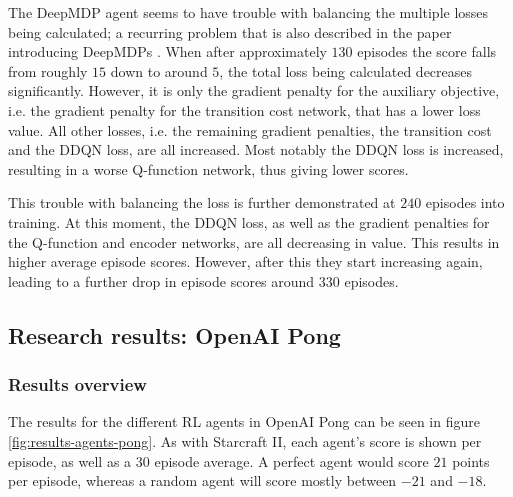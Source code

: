 The DeepMDP agent seems to have trouble with balancing the multiple losses being calculated; a recurring problem that is also described in the paper introducing DeepMDPs \cite{deepmdp}. When after approximately $130$ episodes the score falls from roughly $15$ down to around $5$, the total loss being calculated decreases significantly. However, it is only the gradient penalty for the auxiliary objective, i.e. the gradient penalty for the transition cost network, that has a lower loss value.  All other losses, i.e. the remaining gradient penalties, the transition cost and the DDQN loss, are all increased. Most notably the DDQN loss is increased, resulting in a worse Q-function network, thus giving lower scores.

This trouble with balancing the loss is further demonstrated at $240$ episodes into training. At this moment, the DDQN loss, as well as the gradient penalties for the Q-function and encoder networks, are all decreasing in value. This results in higher average episode scores. However, after this they start increasing again, leading to a further drop in episode scores around $330$ episodes.

\clearpage
\subsection{Research results: OpenAI Pong}\label{research-results-pong}
\subsubsection{Results overview}
The results for the different RL agents in OpenAI Pong can be seen in figure \ref{fig:results-agents-pong}. As with Starcraft II, each agent's score is shown per episode, as well as a $30$ episode average. A perfect agent would score $21$ points per episode, whereas a random agent will score mostly between $-21$ and $-18$.

